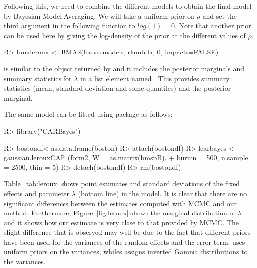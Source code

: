 \documentclass[article]{jss}
\begin{document}
Following this, we need to combine the different models to obtain the final
model by Bayesian Model Averaging. We will take a uniform prior on $\rho$ and
set the third argument in the following function to $log(1)=0$. Note that
another prior can be used here by giving the log-density of the prior at the
different values of $\rho$.



\begin{Schunk}
\begin{Sinput}
R> bmaleroux <- BMA2(lerouxmodels, rlambda, 0, impacts=FALSE)
\end{Sinput}
\end{Schunk}


\noindent
{} is similar to the object returned by  and it
includes the posterior marginals and summary statistics for $\lambda$
in a list element named . This provides summary statistics (mean,
standard deviation and some quantiles) and the posterior marginal.

The same model can be fitted using package  \citep{CARBayes:2013}
as follows:

\begin{Schunk}
\begin{Sinput}
R> library("CARBayes")
\end{Sinput}
\end{Schunk}
\begin{Schunk}
\begin{Sinput}
R> bostondf<-as.data.frame(boston)
R> attach(bostondf)
R> lcarbayes <-  gaussian.lerouxCAR (form2, W = as.matrix(bmspB), 
+     burnin = 500,  n.sample = 2500, thin = 5)
R> detach(bostondf)
R> rm(bostondf)
\end{Sinput}
\end{Schunk}


Table~\ref{tab:leroux} shows point estimates and standard deviations of the
fixed effects and parameter $\lambda$ (bottom line) in the model. It is clear
that there are no significant differences between the estimates computed with
MCMC and our method.  Furthermore, Figure~\ref{fig:leroux} shows the marginal
distribution of $\lambda$ and it shows how our estimate is very close to that
provided by MCMC. The slight difference that is observed may well be due to the
fact that different priors have been used for the variances of the random
effects and the error term.  uses uniform priors on the variances,
whiles  assigns inverted Gamma distributions to the variances.
\end{document}

